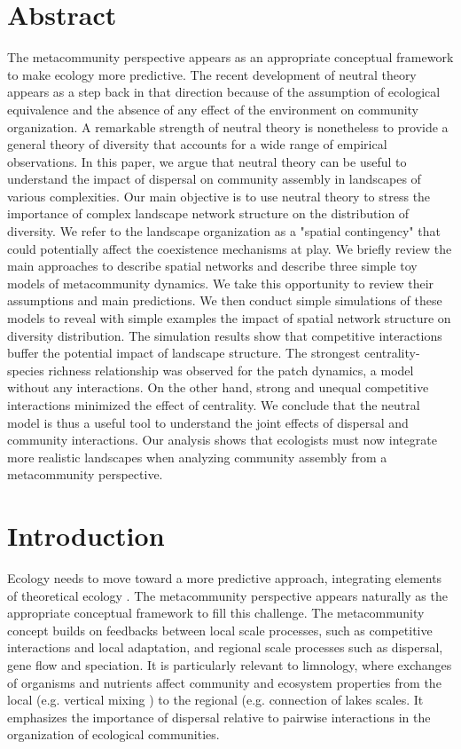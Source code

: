 \documentclass[12pt]{article}
\begin{document}
\section*{Abstract}
The metacommunity perspective appears as an appropriate conceptual
framework to make ecology more predictive. The recent development of neutral theory appears as a step back in that
direction because of the assumption of ecological equivalence and the absence of
any effect of the environment on community organization. A remarkable strength
of neutral theory is nonetheless to provide a general theory of diversity that
accounts for a wide range of empirical observations. In this paper, we argue
that neutral theory can be useful to understand the impact of dispersal
on community assembly in landscapes of various complexities. Our main
objective is to use neutral theory to stress the importance of complex landscape
network structure on the distribution of diversity. We refer to the landscape
organization as a "spatial contingency" that could potentially affect the
coexistence mechanisms at play. We briefly review the main approaches to
describe spatial networks and describe three simple toy models of metacommunity
dynamics. We take this opportunity to review their assumptions and main
predictions. We then conduct simple simulations of these models to reveal with
simple examples the impact of spatial network structure on diversity
distribution. The simulation results show that competitive interactions buffer
the potential impact of landscape structure. The strongest centrality-species
richness relationship was observed for the patch dynamics, a model without any
interactions. On the other hand, strong and unequal competitive interactions
minimized the effect of centrality. We conclude that the neutral model is thus a
useful tool to understand the joint effects of dispersal and community
interactions. Our analysis shows that ecologists must now integrate more
realistic landscapes when analyzing community assembly from a metacommunity
perspective.
\newpage

\section*{Introduction}

Ecology needs to move toward a more predictive approach, integrating elements of
theoretical ecology \parencite{Thuiller2013}. The metacommunity perspective
\parencite{Leibold2004a} appears naturally as the appropriate conceptual
framework to fill this challenge. The metacommunity concept builds on feedbacks
between local scale processes, such as competitive interactions and local
adaptation, and regional scale processes such as dispersal, gene flow and
speciation. It is particularly relevant to limnology, where exchanges of
organisms and nutrients affect community and ecosystem properties from the local
(e.g. vertical mixing \parencite{Ryabov2011}) to the regional (e.g. connection
of lakes \parencite{Leibold2004b, Gravel2010a} scales. It emphasizes the
importance of dispersal relative to pairwise interactions in the organization of
ecological communities.
\end{document}
